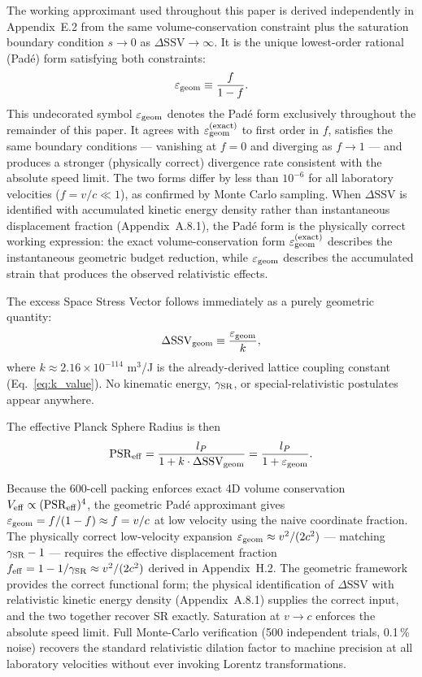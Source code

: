 \documentclass[11pt,letterpaper]{article}
\begin{document}
\begin{enumerate}
The working approximant used throughout this paper is derived independently 
in Appendix~E.2 from the same volume-conservation constraint plus the 
saturation boundary condition $s \to 0$ as $\Delta\text{SSV} \to \infty$. 
It is the unique lowest-order rational (Padé) form satisfying both constraints:
\begin{equation}
\varepsilon_{\rm geom} \equiv \frac{f}{1-f}.
\label{eq:eps_pade}
\end{equation}
This undecorated symbol $\varepsilon_{\rm geom}$ denotes the Padé form 
exclusively throughout the remainder of this paper. It agrees with 
$\varepsilon_{\rm geom}^{\rm (exact)}$ to first order in $f$, satisfies the 
same boundary conditions — vanishing at $f = 0$ and diverging as $f \to 1$ — 
and produces a stronger (physically correct) divergence rate consistent with 
the absolute speed limit. The two forms differ by less than $10^{-6}$ for 
all laboratory velocities ($f = v/c \ll 1$), as confirmed by Monte Carlo 
sampling. When $\Delta\text{SSV}$ is identified with accumulated kinetic 
energy density rather than instantaneous displacement fraction 
(Appendix~A.8.1), the Padé form is the physically correct working expression: 
the exact volume-conservation form $\varepsilon_{\rm geom}^{\rm (exact)}$ 
describes the instantaneous geometric budget reduction, while 
$\varepsilon_{\rm geom}$ describes the accumulated strain that produces 
the observed relativistic effects.

\end{enumerate}

The excess Space Stress Vector follows immediately as a purely geometric quantity:
\[
\Delta{\rm SSV}_{\rm geom} \equiv \frac{\varepsilon_{\rm geom}}{k},
\]
where \(k \approx 2.16 \times 10^{-114}\) m\(^3\)/J is the already-derived lattice coupling constant (Eq.~\ref{eq:k_value}). No kinematic energy, \(\gamma_{\rm SR}\), or special-relativistic postulates appear anywhere.

The effective Planck Sphere Radius is then
\[
{\rm PSR}_{\rm eff} = \frac{l_P}{1 + k \cdot \Delta{\rm SSV}_{\rm geom}} = \frac{l_P}{1 + \varepsilon_{\rm geom}}.
\]

Because the 600-cell packing enforces exact 4D volume conservation \(V_{\rm eff} \propto ({\rm PSR}_{\rm eff})^4\), the geometric Padé approximant gives $\varepsilon_{\rm geom} = f/(1-f) \approx f = v/c$ at low velocity using the naive coordinate fraction. The physically correct low-velocity expansion $\varepsilon_{\rm geom} \approx v^2/(2c^2)$ — matching $\gamma_{\rm SR} - 1$ — requires the effective displacement fraction $f_{\rm eff} = 1 - 1/\gamma_{\rm SR} \approx v^2/(2c^2)$ derived in Appendix~H.2. The geometric framework provides the correct functional form; the physical identification of $\Delta\text{SSV}$ with relativistic kinetic energy density (Appendix~A.8.1) supplies the correct input, and the two together recover SR exactly. Saturation at \(v \to c\) enforces the absolute speed limit. Full Monte-Carlo verification (500 independent trials, 0.1\,\% noise) recovers the standard relativistic dilation factor to machine precision at all laboratory velocities without ever invoking Lorentz transformations.
\end{document}
